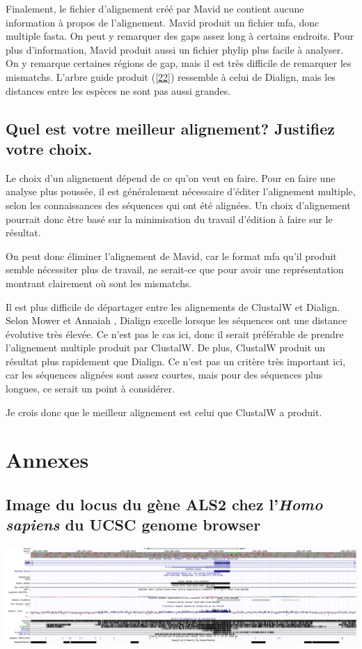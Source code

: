 \documentclass[10.9pt]{article} %
\renewcommand{\thesubsection}{\alph{subsection}}
\begin{document}
Finalement, le fichier d'alignement créé par Mavid ne contient aucune information à propos de
l'alignement. Mavid produit un fichier mfa, donc multiple fasta. On peut y remarquer des
gaps assez long à certains endroits. Pour plus d'information, Mavid produit
aussi un fichier phylip plus facile à analyser. On y remarque certaines régions de gap, 
mais il est très difficile de remarquer les mismatchs. L'arbre guide produit (\ref{22})
ressemble à celui de Dialign, mais les distances entre les espèces ne sont pas aussi grandes.

\subsection[Meilleur alignement]{Quel est votre meilleur alignement? Justifiez votre choix.}

Le choix d'un alignement dépend de ce qu'on veut en faire. Pour en faire une analyse
plus poussée, il est généralement nécessaire d'éditer l'alignement multiple, 
selon les connaissances des séquences qui ont été alignées. Un choix d'alignement pourrait 
donc être basé sur la minimisation du travail d'édition à faire sur le résultat.

On peut donc éliminer l'alignement de Mavid, car le format mfa qu'il produit semble
nécessiter plus de travail, ne serait-ce que pour avoir une représentation montrant 
clairement où sont les mismatchs.

Il est plus difficile de départager entre les alignements de ClustalW et Dialign. 
Selon Mower et Annaiah \cite{Mower et Annaiah}, Dialign excelle lorsque les séquences ont une distance évolutive 
très élevée. Ce n'est pas le cas ici, donc il serait préférable de prendre l'alignement
multiple produit par ClustalW. De plus, ClustalW produit un résultat plus rapidement 
que Dialign. Ce n'est pas un critère très important ici, car les séquences alignées sont assez
courtes, mais pour des séquences plus longues, ce serait un point à considérer.

Je crois donc que le meilleur alignement est celui que ClustalW a produit.

\begingroup
\renewcommand{\appendix}{%
    \renewcommand{\thesubsection}{\arabic{subsection}}
}

\newpage
\appendix
\section{Annexes}
\subsection{Image du locus du gène ALS2 chez l'\emph{Homo sapiens} du UCSC genome browser}\label{1}
\includegraphics[width=\linewidth]{annexes/question_1/annexe1_ucsc.png}
\end{document}
